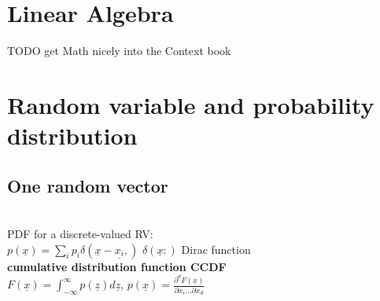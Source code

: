 
\section{Linear Algebra}
\textbullet TODO get Math nicely into the Context book \\
\section{Random variable and probability distribution}
\subsection{One random vector}
 \\

PDF for a discrete-valued RV: \\
$p(\underline{x}) = \sum_i p_i \delta (\underline{x} - \underline{x_i}, )$ $\delta (\underline{x}: )$ Dirac function \\
\textbf{cumulative distribution function CCDF} \\
$F(\underline{x}) = \int_{-\infty}^{\infty} p(\underline{z}) d\underline{z}$, \quad $p(\underline{x}) = \frac{\partial^d F(\underline{x}) } {\partial x_i ... \partial x_d}$  \\
 \\


